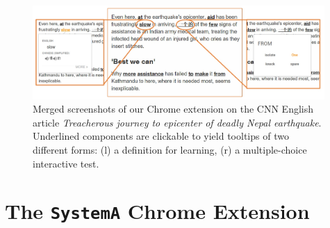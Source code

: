 \begin{figure}[ht]
\centering
\includegraphics[width=0.99\textwidth]{chrome_extension.jpg}
\caption{Merged screenshots of our Chrome extension on the CNN English
  article {\it Treacherous journey to epicenter of deadly Nepal
    earthquake}.  Underlined components are clickable to yield
  tooltips of two different forms: (l) a definition for learning, (r)
  a multiple-choice interactive test.}
\label{fig:chrome_extension_1}
\end{figure}

\section{The {\tt SystemA} Chrome Extension}

